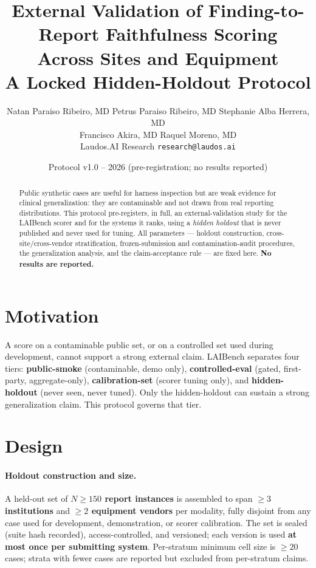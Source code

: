 \documentclass[11pt]{article}
\title{External Validation of Finding-to-Report Faithfulness Scoring\\ Across Sites and Equipment\\[4pt]\large A Locked Hidden-Holdout Protocol}
\author{
  Natan Paraiso Ribeiro, MD \quad Petrus Paraiso Ribeiro, MD \quad Stephanie Alba Herrera, MD \\
  Francisco Akira, MD \quad Raquel Moreno, MD \\[6pt]
  \normalsize Laudos.AI Research \quad\textbullet\quad \texttt{research@laudos.ai}
}
\date{Protocol v1.0 -- 2026 (pre-registration; no results reported)}
\begin{document}
\maketitle

\begin{abstract}
Public synthetic cases are useful for harness inspection but are weak evidence for clinical generalization: they are contaminable and not drawn from real reporting distributions. This protocol pre-registers, in full, an external-validation study for the LAIBench scorer and for the systems it ranks, using a \emph{hidden holdout} that is never published and never used for tuning. All parameters --- holdout construction, cross-site/cross-vendor stratification, frozen-submission and contamination-audit procedures, the generalization analysis, and the claim-acceptance rule --- are fixed here. \textbf{No results are reported.}
\end{abstract}

\section{Motivation}
A score on a contaminable public set, or on a controlled set used during development, cannot support a strong external claim. LAIBench separates four tiers: \textbf{public-smoke} (contaminable, demo only), \textbf{controlled-eval} (gated, first-party, aggregate-only), \textbf{calibration-set} (scorer tuning only), and \textbf{hidden-holdout} (never seen, never tuned). Only the hidden-holdout can sustain a strong generalization claim. This protocol governs that tier.

\section{Design}

\paragraph{Holdout construction and size.} A held-out set of \textbf{$N \geq 150$ report instances} is assembled to span \textbf{$\geq 3$ institutions} and \textbf{$\geq 2$ equipment vendors} per modality, fully disjoint from any case used for development, demonstration, or scorer calibration. The set is sealed (suite hash recorded), access-controlled, and versioned; each version is used \textbf{at most once per submitting system}. Per-stratum minimum cell size is \textbf{$\geq 20$} cases; strata with fewer cases are reported but excluded from per-stratum claims.
\end{document}
